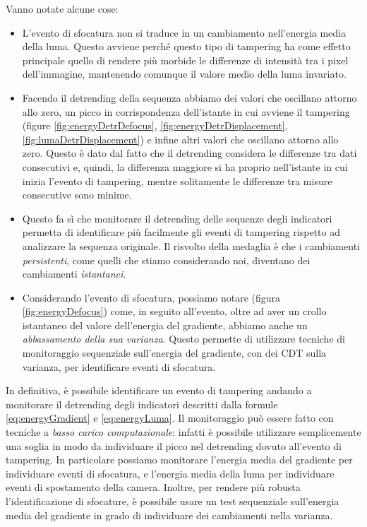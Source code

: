 Vanno notate alcune cose:
\begin{itemize}
	\item L'evento di sfocatura non si traduce in un cambiamento nell'energia media della luma.
	Questo avviene perch\'e questo tipo di tampering ha come effetto principale quello di rendere pi\`u morbide le differenze di intensit\`a tra i pixel dell'immagine, mantenendo comunque il valore medio della luma invariato.
	\item Facendo il detrending della sequenza abbiamo dei valori che oscillano attorno allo zero, un picco in corrispondenza dell'istante in cui avviene il tampering (figure \ref{fig:energyDetrDefocus}, \ref{fig:energyDetrDisplacement}, \ref{fig:lumaDetrDisplacement}) e infine altri valori che oscillano attorno allo zero.
	Questo \`e dato dal fatto che il detrending considera le differenze tra dati consecutivi e, quindi, la differenza maggiore si ha proprio nell'istante in cui inizia l'evento di tampering, mentre solitamente le differenze tra misure consecutive sono minime. 
	\item Questo fa s\`i che monitorare il detrending delle sequenze degli indicatori permetta di identificare pi\`u facilmente gli eventi di tampering rispetto ad analizzare la sequenza originale.
	Il risvolto della medaglia \`e che i cambiamenti \textit{persistenti}, come quelli che stiamo considerando noi, diventano dei cambiamenti \textit{istantanei}.
	\item Considerando l'evento di sfocatura, possiamo notare (figura \ref{fig:energyDefocus}) come, in seguito all'evento, oltre ad aver un crollo istantaneo del valore dell'energia del gradiente, abbiamo anche un \textit{abbassamento della sua varianza}.
	Questo permette di utilizzare tecniche di monitoraggio sequenziale sull'energia del gradiente, con dei CDT sulla varianza, per identificare eventi di sfocatura.
\end{itemize}
In definitiva, \`e possibile identificare un evento di tampering andando a monitorare il detrending degli indicatori descritti dalla formule \eqref{eq:energyGradient} e \eqref{eq:energyLuma}.
Il monitoraggio pu\`o essere fatto con tecniche a \textit{basso carico computazionale}: infatti \`e possibile utilizzare semplicemente una soglia in modo da individuare il picco nel detrending dovuto all'evento di tampering.
In particolare possiamo monitorare l'energia media del gradiente per individuare eventi di sfocatura, e l'energia media della luma per individuare eventi di spostamento della camera.
Inoltre, per rendere pi\`u robusta l'identificazione di sfocature, \`e possibile usare un test sequenziale sull'energia media del gradiente in grado di individuare dei cambiamenti nella varianza.\\
